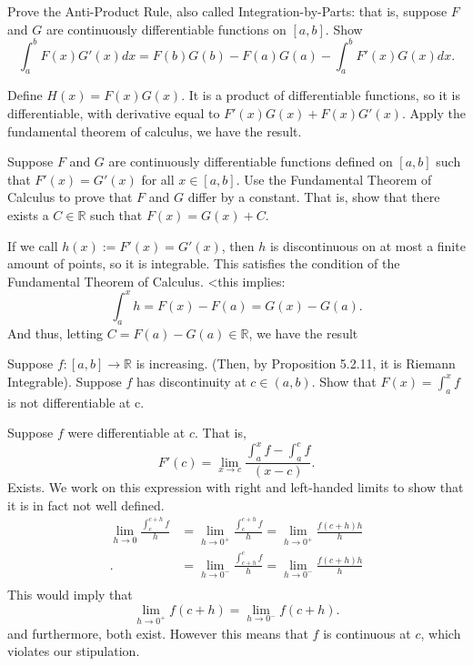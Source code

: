 \documentclass[11 pt]{article}
\begin{document}
\pagebreak
\begin{problem}
	Prove the Anti-Product Rule, also called Integration-by-Parts: that is, suppose $F$ and $G$ are continuously differentiable functions on  $[a,b]$. Show \[
	\int_{a}^{b}F(x)G'(x)dx=F(b)G(b)-F(a)G(a)-\int_{a}^{b}F'(x)G(x)dx
	.\] 
\end{problem}
\begin{solution}
	Define $H(x)=F(x)G(x)$. It is a product of differentiable functions, so it is differentiable, with derivative equal to $F'(x)G(x)+F(x)G'(x)$.
	Apply the fundamental theorem of calculus, we have the result.
\end{solution}
\pagebreak
\begin{problem}
	Suppose $F$ and $G$ are continuously differentiable functions defined on $[a,b]$ such that $F'(x)=G'(x)$ for all $x\in[a,b]$. Use the Fundamental Theorem of Calculus to prove that  $F$ and $G$ differ by a constant. That is, show that there exists a $C\in\mathbb{R}$ such that $F(x)=G(x)+C$.
\end{problem}
\begin{solution}
	If we call $h(x):=F'(x)=G'(x)$, then $h$ is discontinuous on at most a finite amount of points, so it is integrable.
	This satisfies the condition of the Fundamental Theorem of Calculus. <this implies: \[
	\int_{a}^{x}h=F(x)-F(a)=G(x)-G(a)
	.\] 
	And thus, letting $C=F(a)-G(a)\in\mathbb{R}$, we have the result
\end{solution}
\pagebreak
\begin{problem}
	Suppose $f:[a,b]\to\mathbb{R}$ is increasing. (Then, by Proposition 5.2.11, it is Riemann Integrable). Suppose $f$ has discontinuity at $c\in(a,b)$. Show that $F(x)=\int_{a}^{x}f$ is not differentiable at c.
\end{problem}
\begin{solution}
	Suppose $f$ were differentiable at $c$. That is,\[
	F'(c)= \lim_{x\to c}\frac{\int_{a}^{x}f-\int_{a}^{c}f}{(x-c)}
	.\]   
	Exists. We work on this expression with right and left-handed limits to show that it is in fact not well defined.
\begin{align}
	\lim_{h\to 0}\frac{\int_{c}^{c+h}f}{h} & =\lim_{h\to 0^{+}}\frac{\int_{c}^{c+h}f}{h} =\lim_{h\to 0^{+}}\frac{f(c+h)h}{h}\\
	. 					& =\lim_{h\to0^{-}}\frac{\int_{c+h}^{c}f}{h} = \lim_{h\to 0^{-}}\frac{f(c+h)h}{h}\\
\end{align}
This would imply that \[
\lim_{h\to 0^{+}}f(c+h)=\lim_{h\to 0^{-}}f(c+h)
.\] 
and furthermore, both exist. However this means that $f$ is continuous at $c$, which violates our stipulation.
\end{solution}
\end{document}

